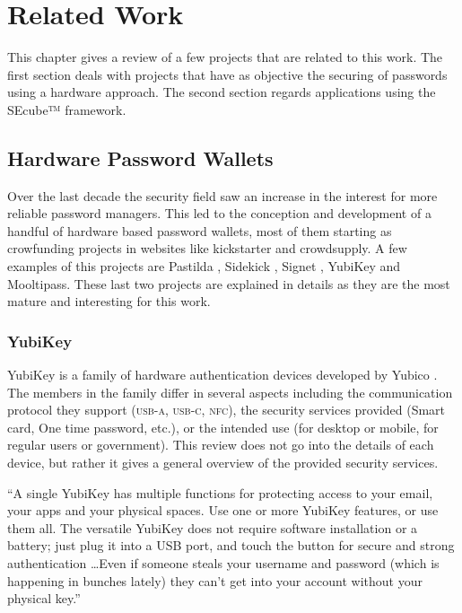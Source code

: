 \chapter{Related Work} \label{chap:related}

This chapter gives a review of a few projects that are related to this work. The first section deals with projects that have as objective the securing of passwords using a hardware approach. The second section regards applications using the SEcube™ framework.

\section {Hardware Password Wallets}
Over the last decade the security field saw an increase in the interest for more reliable password managers. This led to the conception and development of a handful of hardware based password wallets, most of them starting as crowfunding projects in websites like kickstarter and crowdsupply. A few examples of this projects are Pastilda \cite{pasti}, Sidekick \cite{side}, Signet \cite{signet},  YubiKey and Mooltipass. These last two projects are explained in details as they are the most mature and interesting for this work.


\subsection{YubiKey}

YubiKey is a family of hardware authentication devices developed by Yubico \cite{yubi}. The members in the family differ in several aspects including the communication protocol they support (\textsc{usb-a}, \textsc{usb-c}, \textsc{nfc}), the security services provided (Smart card, One time password, etc.), or the intended use (for desktop or mobile, for regular users or government). This review does not go into the details of each device, but rather it gives a general overview of the provided security services. 

``A single YubiKey has multiple functions for protecting access to your email, your apps and your physical spaces. Use one or more YubiKey features, or use them all. The versatile YubiKey does not require software installation or a battery; just plug it into a USB port, and touch the button for secure and strong authentication \ldots  Even if someone steals your username and password (which is happening in bunches lately) they can’t get into your account without your physical key.'' \cite{yubiworks}

